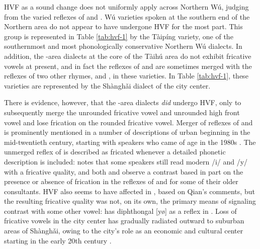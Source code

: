 \documentclass[output=paper,hidelinks]{langscibook}
\begin{document}
HVF as a sound change does not uniformly apply across Northern Wú, judging from the varied reflexes of  \pri{} and \pry{}.
%
Wú varieties spoken at the southern end of the Northern area do not appear to have undergone HVF for the most part. This group is represented in Table \ref{tab:hvf-1} by the Tàipíng  variety, one of the southernmost and most phonologically conservative Northern Wú dialects.
%
In addition, the \SH{}-area dialects at the core of the Tàihú area do not exhibit fricative vowels at present, and in fact the reflexes of  \pri{} and \pry{} are sometimes merged with the reflexes of two other  rhymes, \prien{} and \pryen{}, in these varieties. In Table \ref{tab:hvf-1}, these varieties are represented by the Shàngh\v{a}i dialect of the city center.


There is evidence, however, that the \SH{}-area dialects \textit{did} undergo HVF, only to subsequently merge the unrounded fricative vowel and unrounded high front vowel and lose frication on the rounded fricative vowel.
%
Merger of reflexes of \pri{} and \prien{} is prominently mentioned in a number of descriptions of urban  beginning in the mid-twentieth century, starting with speakers who came of age in the 1980s \citep{xu-tang-62, xu-tang, chen-zm-diss}.
%
The unmerged reflex of \pri{} is described as fricated whenever a detailed phonetic description is included:
\citet[45]{qian} notes that some speakers still read modern \SH{} /i/ and /y/ with a fricative quality, and both \citet[14]{zhu-grammar} and \citet[329--330]{chen-gussenhoven} observe a contrast based in part on the presence or absence of frication in the reflexes of  \pri{} and \prien{} for some of their older consultants.
%
HVF also seems to have affected  \pry{} in \SH{}, based on Qian's comments, but the resulting fricative quality was not, on its own, the primary means of signaling contrast with some other vowel:  \pryen{} has diphthongal [yø] as a reflex in  \citep{qian}.
%
Loss of fricative vowels in the city center has gradually radiated outward to suburban areas of Shàngh\v{a}i, owing to the city's role as an economic and cultural center starting in the early 20th century \citep{qian-shen, chen-zm-diss}.
\end{document}
